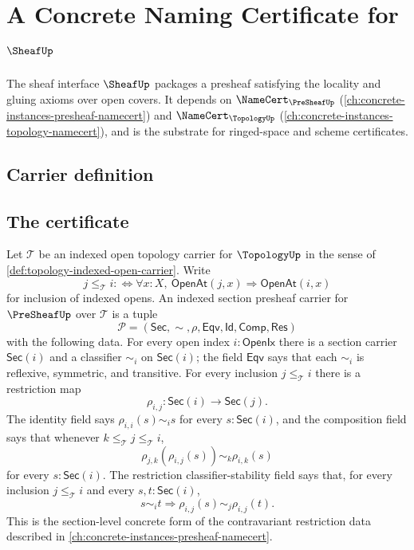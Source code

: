 \chapter{A Concrete Naming Certificate for $\SheafUp$}
\label{ch:concrete-instances-sheaf-namecert}

The sheaf interface $\SheafUp$ packages a presheaf satisfying the locality and gluing axioms over open covers. It depends on $\NameCert_{\PreSheafUp}$ (\autoref{ch:concrete-instances-presheaf-namecert}) and $\NameCert_{\TopologyUp}$ (\autoref{ch:concrete-instances-topology-namecert}), and is the substrate for ringed-space and scheme certificates.

\section{Carrier definition}
\label{sec:sheaf-carrier}

\section{The certificate}
\label{sec:sheaf-certificate}

\begin{definition}
\label{def:sheaf-indexed-section-presheaf-carrier}
Let $\mathcal{T}$ be an indexed open topology carrier for $\TopologyUp$ in the sense of \autoref{def:topology-indexed-open-carrier}. Write
$$
j\le_{\mathcal{T}} i
:\Longleftrightarrow
\forall x:X,\ \mathsf{OpenAt}(j,x)\Longrightarrow\mathsf{OpenAt}(i,x)
$$
for inclusion of indexed opens. An indexed section presheaf carrier for $\PreSheafUp$ over $\mathcal{T}$ is a tuple
$$
\mathcal{P}=(\mathsf{Sec},\sim,\rho,\mathsf{Eqv},\mathsf{Id},\mathsf{Comp},\mathsf{Res})
$$
with the following data. For every open index $i:\mathsf{OpenIx}$ there is a section carrier $\mathsf{Sec}(i)$ and a classifier $\sim_i$ on $\mathsf{Sec}(i)$; the field $\mathsf{Eqv}$ says that each $\sim_i$ is reflexive, symmetric, and transitive. For every inclusion $j\le_{\mathcal{T}} i$ there is a restriction map
$$
\rho_{i,j}:\mathsf{Sec}(i)\to\mathsf{Sec}(j).
$$
The identity field says $\rho_{i,i}(s)\sim_i s$ for every $s:\mathsf{Sec}(i)$, and the composition field says that whenever $k\le_{\mathcal{T}}j\le_{\mathcal{T}}i$,
$$
\rho_{j,k}(\rho_{i,j}(s))\sim_k\rho_{i,k}(s)
$$
for every $s:\mathsf{Sec}(i)$. The restriction classifier-stability field says that, for every inclusion $j\le_{\mathcal{T}}i$ and every $s,t:\mathsf{Sec}(i)$,
$$
s\sim_i t
\Longrightarrow
\rho_{i,j}(s)\sim_j\rho_{i,j}(t).
$$
This is the section-level concrete form of the contravariant restriction data described in \autoref{ch:concrete-instances-presheaf-namecert}.
\end{definition}

